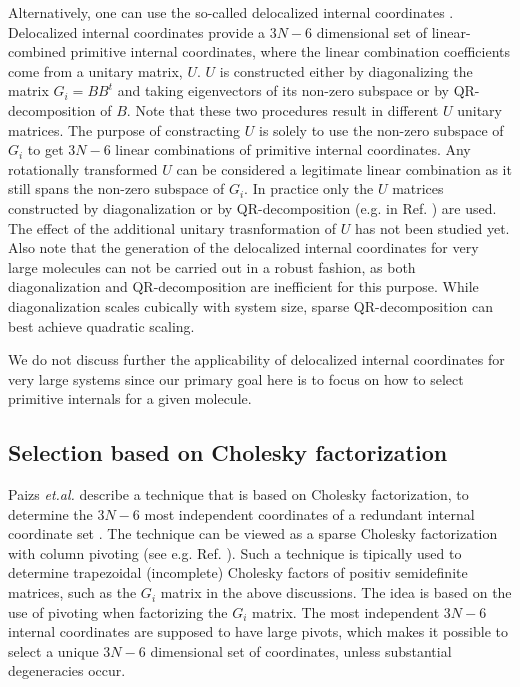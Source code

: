 \documentclass[prl,aps,preprint,superbib,12pt]{revtex4}
\begin{document}
Alternatively, one can use the so-called delocalized
internal coordinates \cite{JBaker96}. Delocalized internal coordinates
provide a $3N-6$ dimensional set of linear-combined primitive
internal coordinates, where the linear combination coefficients
come from a unitary matrix, $U$. $U$ is constructed either by
diagonalizing the matrix $G_{i}=BB^{t}$ and taking eigenvectors of 
its non-zero subspace or by QR-decomposition of
$B$. Note that these two procedures result in different $U$ unitary 
matrices. The purpose of constracting $U$ is solely to use
the non-zero subspace of $G_{i}$ to get $3N-6$ linear combinations
of primitive internal coordinates. Any rotationally transformed
$U$ can be considered a legitimate linear combination as it still spans
the non-zero subspace of $G_{i}$. In practice 
only the $U$ matrices constructed by diagonalization 
\cite{JBaker96,JAndzelm92} or 
by QR-decomposition (e.g. in Ref. )
are used. The effect of the additional unitary trasnformation 
of $U$ has not been studied yet. Also note that the generation of
the delocalized internal coordinates for very large molecules 
can not be carried out in a robust fashion,
as both diagonalization and QR-decomposition are
inefficient for this purpose. While diagonalization scales cubically
with system size, sparse QR-decomposition can best achieve 
quadratic scaling.

We do not discuss further the applicability of delocalized internal 
coordinates for very large systems since our primary goal here is 
to focus on how to select primitive internals for a given molecule.

\subsection{Selection based on Cholesky factorization}
Paizs {\it et.al.} describe a technique that is based
on Cholesky factorization, to determine the $3N-6$ most independent
coordinates of a redundant internal coordinate set \cite{BPaizs00}.
The technique can be viewed as a sparse Cholesky factorization
with column pivoting (see e.g. Ref. ). 
Such a technique
is tipically used to determine trapezoidal (incomplete) Cholesky
factors of positiv semidefinite matrices, such as the $G_{i}$ matrix
in the above discussions. The idea is based on the use of
pivoting when factorizing the $G_{i}$ matrix. The most independent
$3N-6$ internal coordinates are supposed to have large pivots, 
which makes it possible to select a unique $3N-6$ dimensional
set of coordinates, unless substantial degeneracies occur.
\end{document}
